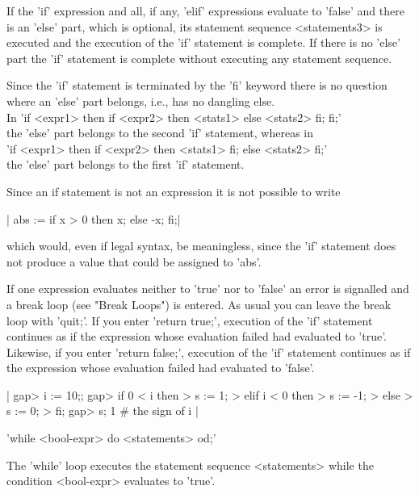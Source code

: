 If the 'if' expression  and all, if  any, 'elif' expressions  evaluate to
'false'  and there is  an 'else'  part, which is  optional, its statement
sequence <statements3>  is  executed   and the   execution of    the 'if'
statement is complete.  If there is no 'else' part  the 'if' statement is
complete without executing any statement sequence.

Since the 'if' statement is  terminated by the  'fi' keyword there  is no
question where an 'else' part belongs, i.e., {\GAP} has no dangling else.\\
In 'if <expr1>  then  if <expr2>  then <stats1>  else <stats2>  fi;  fi;'\\
the 'else' part  belongs  to  the  second   'if'  statement,  whereas  in\\
'if <expr1>  then  if  <expr2>  then  <stats1>  fi;  else  <stats2>  fi;'\\
the 'else' part belongs to the first 'if' statement.

Since an if statement is  not an expression it  is not possible to  write

|    abs := if x  > 0  then  x;  else  -x;  fi;|

which would,  even  if  legal  syntax, be   meaningless,  since  the 'if'
statement does not produce a value that could be assigned to 'abs'.

If one expression evaluates neither to 'true'  nor to 'false' an error is
signalled and a break loop (see "Break Loops") is  entered.  As usual you
can leave   the break loop  with 'quit;'.   If you  enter 'return true;',
execution  of the  'if' statement  continues  as if the expression  whose
evaluation    failed had evaluated to  'true'.     Likewise, if you enter
'return  false;', execution of  the  'if' statement  continues as if  the
expression whose evaluation failed had evaluated to 'false'.

|    gap> i := 10;;
    gap> if 0 < i  then
    >        s := 1;
    >    elif i < 0  then
    >        s := -1;
    >    else
    >        s := 0;
    >    fi;
    gap> s;
    1        # the sign of i |

%

'while <bool-expr>  do <statements>  od;'

The  'while' loop executes the statement  sequence <statements> while the
condition <bool-expr> evaluates to 'true'.

